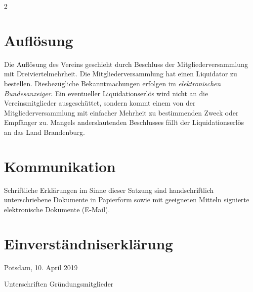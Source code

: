 \documentclass[a4paper, 10pt, headings=normal]{scrartcl}
\newenvironment{textinput}[1]%
{%
	\par%
	\vspace{0.75mm}%
	\noindent%
	\linespread{1}%
	\begin{tcolorbox}[colback=light-gray, sharp corners=all, boxrule=0pt, colframe=light-gray, left=1mm, top=0.3mm, bottom=-0.3mm, right=1mm, width=#1]
		\begin{minipage}[t]{\linewidth}%
			\textinputfont\strut%
}%
{%
			\strut%
		\end{minipage}%
	\end{tcolorbox}
	\vspace{0.75mm}%
}
\begin{document}
\begin{multicols}{2}
\section{Auflösung}
\label{par:aufloseung}

Die Auflösung des Vereins geschieht durch Beschluss der Mitgliederversammlung mit Dreiviertelmehrheit.
Die Mitgliederversammlung hat einen Liquidator zu bestellen.
Diesbezügliche Bekanntmachungen erfolgen im \emph{elektronischen Bundesanzeiger}.
Ein eventueller Liquidationserlös wird nicht an die Vereinsmitglieder ausgeschüttet, sondern kommt einem von der Mitgliederversammlung mit einfacher Mehrheit zu bestimmenden Zweck oder Empfänger zu.
Mangels anderslautenden Beschlusses fällt der Liquidationserlös an das Land Brandenburg.

\section{Kommunikation}
\label{par:kommunikation}

Schriftliche Erklärungen im Sinne dieser Satzung sind handschriftlich unterschriebene Dokumente in Papierform sowie mit geeigneten Mitteln signierte elektronische Dokumente (E-Mail).

\end{multicols}

\section*{Einverständniserklärung}

Potsdam, 10. April 2019

\bigskip

\begin{textinput}{\linewidth}%
	Unterschriften Gründungsmitglieder
	\vspace{90mm}%
\end{textinput}%
\end{document}

